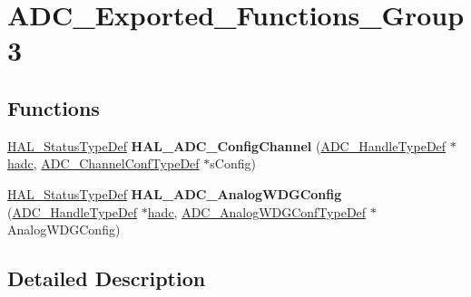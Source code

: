 \hypertarget{group___a_d_c___exported___functions___group3}{\section{A\-D\-C\-\_\-\-Exported\-\_\-\-Functions\-\_\-\-Group3}
\label{group___a_d_c___exported___functions___group3}
}
\subsection*{Functions}
\begin{DoxyCompactItemize}
\item 
\hypertarget{group___a_d_c___exported___functions___group3_gac6f70c4927204d6f50ab44c8e4800106}{\hyperlink{stm32l1xx__hal__def_8h_a63c0679d1cb8b8c684fbb0632743478f}{H\-A\-L\-\_\-\-Status\-Type\-Def} {\bfseries H\-A\-L\-\_\-\-A\-D\-C\-\_\-\-Config\-Channel} (\hyperlink{struct_a_d_c___handle_type_def}{A\-D\-C\-\_\-\-Handle\-Type\-Def} $\ast$\hyperlink{stm32l1xx__it_8c_a62fcafba91cf315db7e0e0c8f22c656f}{hadc}, \hyperlink{struct_a_d_c___channel_conf_type_def}{A\-D\-C\-\_\-\-Channel\-Conf\-Type\-Def} $\ast$s\-Config)}\label{group___a_d_c___exported___functions___group3_gac6f70c4927204d6f50ab44c8e4800106}

\item 
\hypertarget{group___a_d_c___exported___functions___group3_gaebd9d3c15de8c92e92e18ee38d1bd998}{\hyperlink{stm32l1xx__hal__def_8h_a63c0679d1cb8b8c684fbb0632743478f}{H\-A\-L\-\_\-\-Status\-Type\-Def} {\bfseries H\-A\-L\-\_\-\-A\-D\-C\-\_\-\-Analog\-W\-D\-G\-Config} (\hyperlink{struct_a_d_c___handle_type_def}{A\-D\-C\-\_\-\-Handle\-Type\-Def} $\ast$\hyperlink{stm32l1xx__it_8c_a62fcafba91cf315db7e0e0c8f22c656f}{hadc}, \hyperlink{struct_a_d_c___analog_w_d_g_conf_type_def}{A\-D\-C\-\_\-\-Analog\-W\-D\-G\-Conf\-Type\-Def} $\ast$Analog\-W\-D\-G\-Config)}\label{group___a_d_c___exported___functions___group3_gaebd9d3c15de8c92e92e18ee38d1bd998}

\end{DoxyCompactItemize}


\subsection{Detailed Description}
